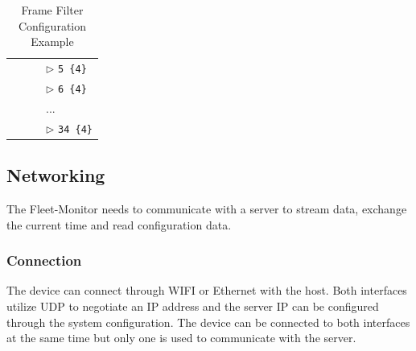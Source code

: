 \begin{table}[h!]
\begin{center}
{\begin{tabular}{p{0.0cm} p{0.1cm} p{0.1cm} p{0.1cm} p{7.0cm}}
        & & & \multicolumn{2}{l}{$\rhd$ \texttt{5 \{4\}}}                                                   \\[0.3em]
        & & & \multicolumn{2}{l}{$\rhd$ \texttt{6 \{4\}}}                                                   \\[0.3em]
        & & & \multicolumn{2}{l}{...}                                                                       \\[0.3em]
        & & & \multicolumn{2}{l}{$\rhd$ \texttt{34 \{4\}}}                                                  \\[0.4em]
        \end{tabular}
    }
    \end{center}
\vspace{-0.3cm}
\caption{\label{fig:frame-configuration-example}Frame Filter Configuration Example}
\end{table}
\newpage

\subsection{Networking}  \label{Networking}
The Fleet-Monitor needs to communicate with a server to stream data, exchange the current time and read configuration data. 
\subsubsection{Connection}
The device can connect through WIFI or Ethernet with the host. Both interfaces utilize UDP to negotiate an IP address and the server IP can be configured through the system configuration. The device can be connected to both interfaces at the same time but only one is used to communicate with the server. 

